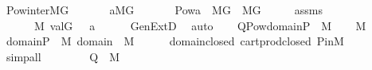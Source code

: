 \begin{isabellebody}
\isanewline
{}\isamarkupfalse%
\ Pow{\isacharunderscore}{\kern0pt}inter{\isacharunderscore}{\kern0pt}MG{\isacharcolon}{\kern0pt}\isanewline
\ \ \isanewline
\ \ \ \ {\isachardoublequoteopen}a{\isasymin}M{\isacharbrackleft}{\kern0pt}G{\isacharbrackright}{\kern0pt}{\isachardoublequoteclose}\isanewline
\ \ \isanewline
\ \ \ \ {\isachardoublequoteopen}Pow{\isacharparenleft}{\kern0pt}a{\isacharparenright}{\kern0pt}\ {\isasyminter}\ M{\isacharbrackleft}{\kern0pt}G{\isacharbrackright}{\kern0pt}\ {\isasymin}\ M{\isacharbrackleft}{\kern0pt}G{\isacharbrackright}{\kern0pt}{\isachardoublequoteclose}\isanewline
%
\isadelimproof
%
\endisadelimproof
%
\isatagproof
{}\isamarkupfalse%
\ {\isacharminus}{\kern0pt}\isanewline
\ \ \isamarkupfalse%
\ assms\ \isamarkupfalse%
\ {\isasymtau}\ \isanewline
\ \ \ \ {\isachardoublequoteopen}{\isasymtau}\ {\isasymin}\ M{\isachardoublequoteclose}\ {\isachardoublequoteopen}val{\isacharparenleft}{\kern0pt}G{\isacharcomma}{\kern0pt}\ {\isasymtau}{\isacharparenright}{\kern0pt}\ {\isacharequal}{\kern0pt}\ a{\isachardoublequoteclose}\isanewline
\ \ \ \ \isamarkupfalse%
\ GenExtD\ \isamarkupfalse%
\ auto\isanewline
\ \ \isamarkupfalse%
\ {\isacharquery}{\kern0pt}Q{\isacharequal}{\kern0pt}{\isachardoublequoteopen}Pow{\isacharparenleft}{\kern0pt}domain{\isacharparenleft}{\kern0pt}{\isasymtau}{\isacharparenright}{\kern0pt}{\isasymtimes}P{\isacharparenright}{\kern0pt}\ {\isasyminter}\ M{\isachardoublequoteclose}\isanewline
\ \ \isamarkupfalse%
\ {\isacartoucheopen}{\isasymtau}{\isasymin}M{\isacartoucheclose}\ \isanewline
\ \ \isamarkupfalse%
\ {\isachardoublequoteopen}domain{\isacharparenleft}{\kern0pt}{\isasymtau}{\isacharparenright}{\kern0pt}{\isasymtimes}P\ {\isasymin}\ M{\isachardoublequoteclose}\ {\isachardoublequoteopen}domain{\isacharparenleft}{\kern0pt}{\isasymtau}{\isacharparenright}{\kern0pt}\ {\isasymin}\ M{\isachardoublequoteclose}\isanewline
\ \ \ \ \isamarkupfalse%
\ domain{\isacharunderscore}{\kern0pt}closed\ cartprod{\isacharunderscore}{\kern0pt}closed\ P{\isacharunderscore}{\kern0pt}in{\isacharunderscore}{\kern0pt}M\isanewline
\ \ \ \ \isamarkupfalse%
\ simp{\isacharunderscore}{\kern0pt}all\isanewline
\ \ \isamarkupfalse%
\ \isanewline
\ \ \isamarkupfalse%
\ {\isachardoublequoteopen}{\isacharquery}{\kern0pt}Q\ {\isasymin}\ M{\isachardoublequoteclose}\isanewline

\end{isabellebody}
